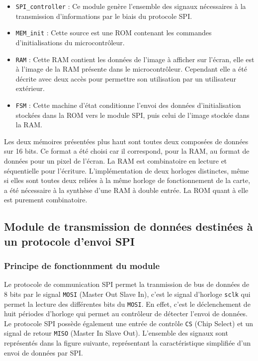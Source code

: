 \documentclass[11pt]{article}
\begin{document}
\begin{itemize}

\item[\textbullet] \texttt{SPI\_controller} : Ce module genère l'ensemble des signaux nécessaires à la transmission d'informations par le biais du protocole SPI.

\item[\textbullet] \texttt{MEM\_init} : Cette source est une ROM contenant les commandes d'initialisations du microcontrôleur.

\item[\textbullet] \texttt{RAM} : Cette RAM contient les données de l'image à afficher sur l'écran, elle est à l'image de la RAM présente dans le microcontrôleur. Cependant elle a été décrite avec deux accès pour permettre son utilisation par un utilisateur extérieur.

\item[\textbullet] \texttt{FSM} : Cette machine d'état conditionne l'envoi des données d'initialisation stockées dans la ROM vers le module SPI, puis celui de l'image stockée dans la RAM.

\end{itemize}

Les deux mémoires présentées plus haut sont toutes deux composées de données sur 16 bits. Ce format a été choisi car il correspond, pour la RAM, au format de données pour un pixel de l'écran. La RAM est combinatoire en lecture et séquentielle pour l'écriture. L'implémentation de deux horloges distinctes, même si  elles sont toutes deux reliées à la même horloge de fonctionnement de la carte, a été nécessaire à la synthèse d'une RAM à double entrée. La ROM quant à elle est purement combinatoire.

\subsection{Module de transmission de données destinées à un protocole d'envoi SPI}

\subsubsection{Principe de fonctionnment du module}

Le protocole de communication SPI permet la tranmission de bus de données de 8 bits par le signal \texttt{MOSI} (Master Out Slave In), c'est le signal d'horloge \texttt{sclk} qui permet la lecture des différentes bits du \texttt{MOSI}. En effet, c'est le déclenchement de huit périodes d'horloge qui permet au contrôleur de détecter l'envoi de données. Le protocole SPI possède également une entrée de contrôle \texttt{CS} (Chip Select) et un signal de retour \texttt{MISO} (Master In Slave Out). L'ensemble des signaux sont représentés dans la figure suivante, représentant la caractéristique simplifiée d'un envoi de données par SPI.
\end{document}

